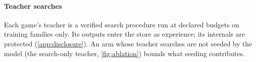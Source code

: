 \paragraph{Teacher searches} Each game's teacher is a verified search procedure run at declared
budgets on training families only. Its outputs enter the store as experience; its internals are
protected (\cref{app:disclosure}). An arm whose teacher searches are not seeded by the model (the
search-only teacher, \cref{fig:ablation}) bounds what seeding contributes.
